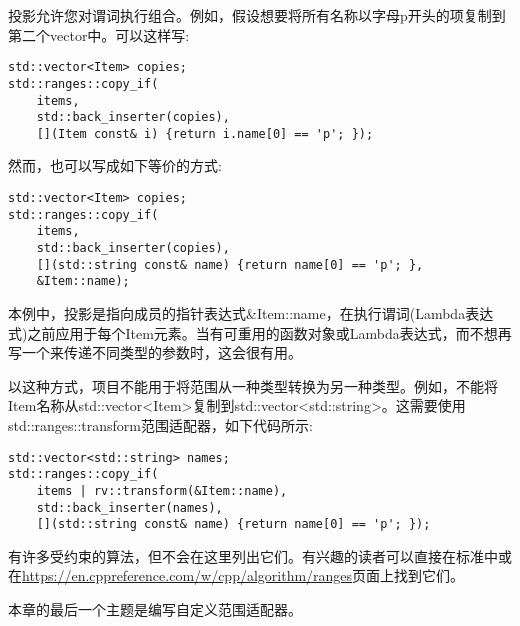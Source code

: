 投影允许您对谓词执行组合。例如，假设想要将所有名称以字母p开头的项复制到第二个vector中。可以这样写:

\begin{lstlisting}[style=styleCXX]
std::vector<Item> copies;
std::ranges::copy_if(
	items,
	std::back_inserter(copies),
	[](Item const& i) {return i.name[0] == 'p'; });
\end{lstlisting}

然而，也可以写成如下等价的方式:

\begin{lstlisting}[style=styleCXX]
std::vector<Item> copies;
std::ranges::copy_if(
	items,
	std::back_inserter(copies),
	[](std::string const& name) {return name[0] == 'p'; },
	&Item::name);
\end{lstlisting}

本例中，投影是指向成员的指针表达式\&Item::name，在执行谓词(Lambda表达式)之前应用于每个Item元素。当有可重用的函数对象或Lambda表达式，而不想再写一个来传递不同类型的参数时，这会很有用。

以这种方式，项目不能用于将范围从一种类型转换为另一种类型。例如，不能将Item名称从std::vector<Item>复制到std::vector<std::string>。这需要使用std::ranges::transform范围适配器，如下代码所示:

\begin{lstlisting}[style=styleCXX]
std::vector<std::string> names;
std::ranges::copy_if(
	items | rv::transform(&Item::name),
	std::back_inserter(names),
	[](std::string const& name) {return name[0] == 'p'; });
\end{lstlisting}

有许多受约束的算法，但不会在这里列出它们。有兴趣的读者可以直接在标准中或在\url{https://en.cppreference.com/w/cpp/algorithm/ranges}页面上找到它们。

本章的最后一个主题是编写自定义范围适配器。




























